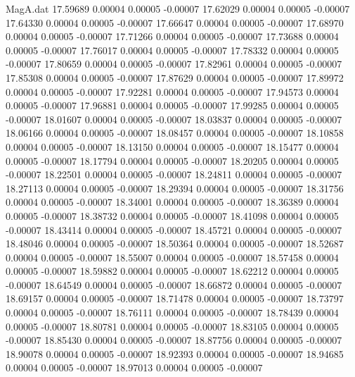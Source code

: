 \begin{filecontents}{MagA.dat}
  17.59689    0.00004    0.00005   -0.00007
  17.62029    0.00004    0.00005   -0.00007
  17.64330    0.00004    0.00005   -0.00007
  17.66647    0.00004    0.00005   -0.00007
  17.68970    0.00004    0.00005   -0.00007
  17.71266    0.00004    0.00005   -0.00007
  17.73688    0.00004    0.00005   -0.00007
  17.76017    0.00004    0.00005   -0.00007
  17.78332    0.00004    0.00005   -0.00007
  17.80659    0.00004    0.00005   -0.00007
  17.82961    0.00004    0.00005   -0.00007
  17.85308    0.00004    0.00005   -0.00007
  17.87629    0.00004    0.00005   -0.00007
  17.89972    0.00004    0.00005   -0.00007
  17.92281    0.00004    0.00005   -0.00007
  17.94573    0.00004    0.00005   -0.00007
  17.96881    0.00004    0.00005   -0.00007
  17.99285    0.00004    0.00005   -0.00007
  18.01607    0.00004    0.00005   -0.00007
  18.03837    0.00004    0.00005   -0.00007
  18.06166    0.00004    0.00005   -0.00007
  18.08457    0.00004    0.00005   -0.00007
  18.10858    0.00004    0.00005   -0.00007
  18.13150    0.00004    0.00005   -0.00007
  18.15477    0.00004    0.00005   -0.00007
  18.17794    0.00004    0.00005   -0.00007
  18.20205    0.00004    0.00005   -0.00007
  18.22501    0.00004    0.00005   -0.00007
  18.24811    0.00004    0.00005   -0.00007
  18.27113    0.00004    0.00005   -0.00007
  18.29394    0.00004    0.00005   -0.00007
  18.31756    0.00004    0.00005   -0.00007
  18.34001    0.00004    0.00005   -0.00007
  18.36389    0.00004    0.00005   -0.00007
  18.38732    0.00004    0.00005   -0.00007
  18.41098    0.00004    0.00005   -0.00007
  18.43414    0.00004    0.00005   -0.00007
  18.45721    0.00004    0.00005   -0.00007
  18.48046    0.00004    0.00005   -0.00007
  18.50364    0.00004    0.00005   -0.00007
  18.52687    0.00004    0.00005   -0.00007
  18.55007    0.00004    0.00005   -0.00007
  18.57458    0.00004    0.00005   -0.00007
  18.59882    0.00004    0.00005   -0.00007
  18.62212    0.00004    0.00005   -0.00007
  18.64549    0.00004    0.00005   -0.00007
  18.66872    0.00004    0.00005   -0.00007
  18.69157    0.00004    0.00005   -0.00007
  18.71478    0.00004    0.00005   -0.00007
  18.73797    0.00004    0.00005   -0.00007
  18.76111    0.00004    0.00005   -0.00007
  18.78439    0.00004    0.00005   -0.00007
  18.80781    0.00004    0.00005   -0.00007
  18.83105    0.00004    0.00005   -0.00007
  18.85430    0.00004    0.00005   -0.00007
  18.87756    0.00004    0.00005   -0.00007
  18.90078    0.00004    0.00005   -0.00007
  18.92393    0.00004    0.00005   -0.00007
  18.94685    0.00004    0.00005   -0.00007
  18.97013    0.00004    0.00005   -0.00007

\end{filecontents}
